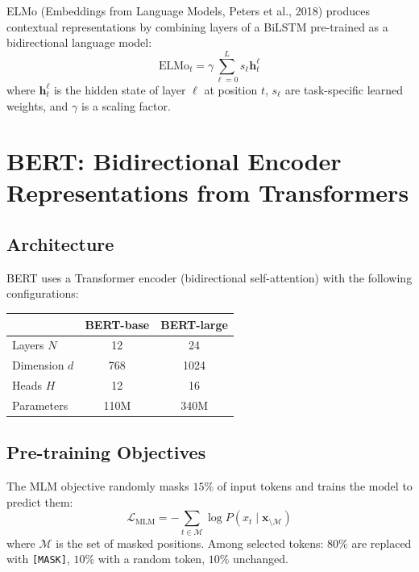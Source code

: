 \begin{definition}[ELMo]
ELMo (Embeddings from Language Models, Peters et al., 2018) produces
contextual representations by combining layers of a BiLSTM pre-trained as a
bidirectional language model:
\[
\text{ELMo}_t = \gamma \sum_{\ell=0}^{L} s_\ell \mathbf{h}_t^\ell
\]
where $\mathbf{h}_t^\ell$ is the hidden state of layer $\ell$ at position $t$,
$s_\ell$ are task-specific learned weights, and $\gamma$ is a scaling factor.
\end{definition}

\section{BERT: Bidirectional Encoder Representations from Transformers}
\label{sec:pre:bert}

\subsection{Architecture}

BERT uses a Transformer encoder (bidirectional self-attention) with the
following configurations:

\begin{center}
\begin{tabular}{lcc}
\toprule
& \textbf{BERT-base} & \textbf{BERT-large} \\
\midrule
Layers $N$ & 12 & 24 \\
Dimension $d$ & 768 & 1024 \\
Heads $H$ & 12 & 16 \\
Parameters & 110M & 340M \\
\bottomrule
\end{tabular}
\end{center}

\subsection{Pre-training Objectives}

\begin{definition}
The MLM objective randomly masks $15\%$ of input tokens and trains the model
to predict them:
\[
\mathcal{L}_{\text{MLM}} = -\sum_{t \in \mathcal{M}} \log P(x_t \mid \mathbf{x}_{\setminus \mathcal{M}})
\]
where $\mathcal{M}$ is the set of masked positions. Among selected tokens:
$80\%$ are replaced with \texttt{[MASK]}, $10\%$ with a random token, $10\%$
unchanged.
\end{definition}

